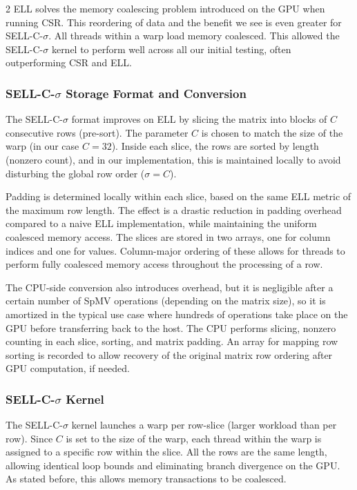 \documentclass{article}
\begin{document}
\begin{multicols}{2}
ELL solves the memory coalescing problem introduced on the GPU when running CSR. This reordering of data and the benefit we see is even greater for SELL-C-$\sigma$. All threads within a warp load memory coalesced. This allowed the SELL-C-$\sigma$ kernel to perform well across all our initial testing, often outperforming CSR and ELL.

\subsubsection{SELL-C-$\sigma$ Storage Format and Conversion}

The SELL-C-$\sigma$ format improves on ELL by slicing the matrix into blocks of $C$ consecutive rows (pre-sort). The parameter $C$ is chosen to match the size of the warp (in our case $C=32$). Inside each slice, the rows are sorted by length (nonzero count), and in our implementation, this is maintained locally to avoid disturbing the global row order ($\sigma=C$). 

Padding is determined locally within each slice, based on the same ELL metric of the maximum row length. The effect is a drastic reduction in padding overhead compared to a naive ELL implementation, while maintaining the uniform coalesced memory access. The slices are stored in two arrays, one for column indices and one for values. Column-major ordering of these allows for threads to perform fully coalesced memory access throughout the processing of a row.

The CPU-side conversion also introduces overhead, but it is negligible after a certain number of SpMV operations (depending on the matrix size), so it is amortized in the typical use case where hundreds of operations take place on the GPU before transferring back to the host. The CPU performs slicing, nonzero counting in each slice, sorting, and matrix padding. An array for mapping row sorting is recorded to allow recovery of the original matrix row ordering after GPU computation, if needed.

\subsubsection{SELL-C-$\sigma$ Kernel}
The SELL-C-$\sigma$ kernel launches a warp per row-slice (larger workload than per row). Since $C$ is set to the size of the warp, each thread within the warp is assigned to a specific row within the slice. All the rows are the same length, allowing identical loop bounds and eliminating branch divergence on the GPU. As stated before, this allows memory transactions to be coalesced.


\end{multicols}
\end{document}
